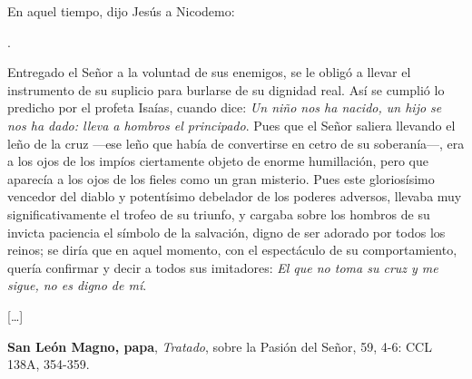 \begin{scripture}
En aquel tiempo, dijo Jesús a Nicodemo:

.
\end{scripture}


\begin{patercite}
Entregado el Señor a la voluntad de sus enemigos, se le obligó a llevar	el instrumento de su suplicio para burlarse de su dignidad real. Así se	cumplió lo predicho por el profeta Isaías, cuando dice: \textit{Un niño nos ha nacido, un hijo se nos ha dado: lleva a hombros el principado}. Pues	que el Señor saliera llevando el leño de la cruz ---ese leño que había de convertirse en cetro de su soberanía---, era a los ojos de los impíos ciertamente objeto de enorme humillación, pero que aparecía a los ojos de los fieles como un gran misterio. Pues este gloriosísimo vencedor del diablo y potentísimo debelador de los poderes adversos, llevaba muy	significativamente el trofeo de su triunfo, y cargaba sobre los hombros	de su invicta paciencia el símbolo de la salvación, digno de ser adorado por todos los reinos; se diría que en aquel momento, con el espectáculo	de su comportamiento, quería confirmar y decir a todos sus imitadores: \textit{El que no toma su cruz y me sigue, no es digno de mí}.

[\ldots]

\textbf{San León Magno, papa}, \textit{Tratado}, sobre la Pasión del Señor, 59, 4-6: CCL 138A, 354-359.
\end{patercite}

